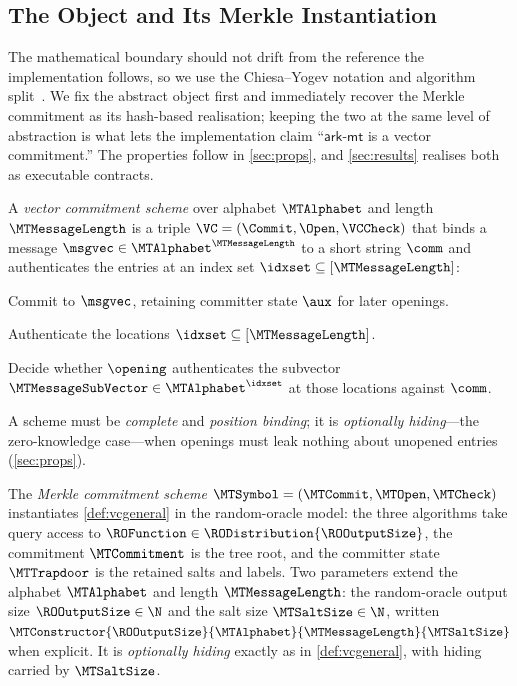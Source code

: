\label{sec:approach}

\subsection{The Object and Its Merkle Instantiation}
\label{sec:syntax}

The mathematical boundary should not drift from the reference the
implementation follows, so we use the Chiesa--Yogev notation and algorithm
split~\cite{CY26}.  We fix the abstract object first and immediately recover the
Merkle commitment as its hash-based realisation; keeping the two at the same
level of abstraction is what lets the implementation claim ``$\textsf{ark-mt}$
is a vector commitment.''  The properties follow in \cref{sec:props}, and
\cref{sec:results} realises both as executable contracts.

\begin{definition}\label{def:vcgeneral}
A \emph{vector commitment scheme} over alphabet $\MTAlphabet$ and length
$\MTMessageLength$ is a triple $\VC=(\Commit,\Open,\VCCheck)$ that binds a
message $\msgvec\in\MTAlphabet^{\MTMessageLength}$ to a short string $\comm$ and
authenticates the entries at an index set $\idxset\subseteq[\MTMessageLength]$:
\begin{description}[leftmargin=2.3em,style=nextline]
  \item[$\Commit(\msgvec)\to(\comm,\aux)$.]
    Commit to $\msgvec$, retaining committer state $\aux$ for later openings.
  \item[$\Open(\aux,\idxset)\to\opening$.]
    Authenticate the locations $\idxset\subseteq[\MTMessageLength]$.
  \item[$\VCCheck(\comm,\idxset,\MTMessageSubVector,\opening)\to\bits$.]
    Decide whether $\opening$ authenticates the subvector
    $\MTMessageSubVector\in\MTAlphabet^{\idxset}$ at those locations against
    $\comm$.
\end{description}
A scheme must be \emph{complete} and \emph{position binding}; it is
\emph{optionally hiding}---the zero-knowledge case---when openings must leak
nothing about unopened entries (\cref{sec:props}).
\end{definition}

\begin{definition}\label{def:vc}
The \emph{Merkle commitment scheme}
$\MTSymbol=(\MTCommit,\MTOpen,\MTCheck)$ instantiates \cref{def:vcgeneral} in
the random-oracle model: the three algorithms take query access to
$\ROFunction\in\RODistribution{\ROOutputSize}$, the commitment $\MTCommitment$
is the tree root, and the committer state $\MTTrapdoor$ is the retained salts
and labels.  Two parameters extend the alphabet $\MTAlphabet$ and length
$\MTMessageLength$: the random-oracle output size $\ROOutputSize\in\N$ and the
salt size $\MTSaltSize\in\N$, written
$\MTConstructor{\ROOutputSize}{\MTAlphabet}{\MTMessageLength}{\MTSaltSize}$ when
explicit.  It is \emph{optionally hiding} exactly as in \cref{def:vcgeneral},
with hiding carried by $\MTSaltSize$.
\end{definition}

